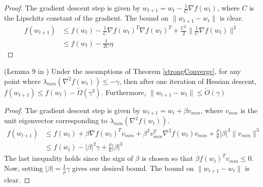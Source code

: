 \begin{proof}
The gradient descent step is given by $w_{t+1} = w_t - \frac{1}{C} \nabla f(w_t)$, where $C$ is the Lipschitz constant of the gradient. The bound on $\|w_{t+1} - w_t\|$ is clear.
\begin{align*}
f(w_{t+1}) &\leq f(w_t) - \frac{1}{C}\nabla f(w_t)^T\nabla f(w_t)^T + \frac{C^2}{2} \|\frac{1}{C}\nabla f(w_t)\|^2 \\
&\leq f(w_t) - \frac{1}{2C} \eta
\end{align*}

\end{proof}

\begin{lemma}(Lemma 9 in \cite{GeHJY15})\label{HessianDecrease}
Under the assumptions of Theorem \ref{strongConverge}, for any point where $\lambda_{min}(\nabla^2 f (w_t)) \leq -\gamma$, then after one iteration of Hessian descent, $f(w_{t+1}) \leq f(w_t) - \widetilde{\Omega}(\gamma^3)$. Furthermore, $\|w_{t+1} - w_t\| \leq \widetilde{O}(\gamma)$
\end{lemma}

\begin{proof}
The gradient descent step is given by $w_{t+1} = w_t + \beta v_{min}$, where $v_{min}$ is the unit eigenvector corresponding to $\lambda_{min}(\nabla^2f(w_t))$.  
\begin{align*}
f(w_{t+1}) &\leq f(w_t) + \beta\nabla f(w_t)^Tv_{min} + \beta^2 v_{min}^T\nabla^2f(w_t)v_{min} + \frac{\rho}{6} |\beta|^3 \|v_{min}\|^3 \\
&\leq f(w_t) - |\beta|^2 \gamma + \frac{\rho}{6} |\beta|^3
\end{align*}
The last inequality holds since the sign of $\beta$ is chosen so that $\beta f(w_t)^Tv_{min} \leq 0$. Now, setting $|\beta| = \frac{1}{\rho}\gamma$ gives our desired bound. The bound on $\|w_{t+1} - w_t\|$ is clear.
\end{proof}


